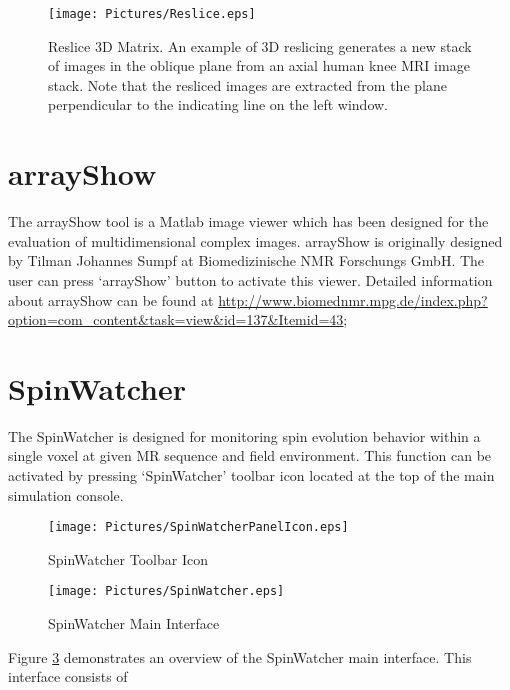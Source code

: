 \documentclass{book}%
\begin{document}
\begin{enumerate}
		\begin{figure}[htbp]
		\centering
			\texttt{[image: Pictures/Reslice.eps]}
		\caption{Reslice 3D Matrix. An example of 3D reslicing generates a new stack of images in the oblique plane from an axial human knee MRI image stack. Note that the resliced images are extracted from the plane perpendicular to the indicating line on the left window.}
		\label{fig:Reslice}
	\end{figure}	
	
\end{enumerate}



\section{arrayShow}

The arrayShow tool is a Matlab image viewer which has been designed for the evaluation of multidimensional complex images. arrayShow is originally designed by Tilman Johannes Sumpf at Biomedizinische NMR Forschungs GmbH. The user can press `arrayShow' button to activate this viewer. Detailed information about arrayShow can be found at \url{http://www.biomednmr.mpg.de/index.php?option=com_content&task=view&id=137&Itemid=43}; 

\section{SpinWatcher}

The SpinWatcher is designed for monitoring spin evolution behavior within a single voxel at given MR sequence and field environment. This function can be activated by pressing `SpinWatcher' toolbar icon located at the top of the main simulation console.

\begin{figure}[htbp]
	\centering
		\texttt{[image: Pictures/SpinWatcherPanelIcon.eps]}
	\caption{SpinWatcher Toolbar Icon}
	\label{fig:SpinWatcherPanelIcon}
\end{figure}

\begin{figure}[htbp]
	\centering
		\texttt{[image: Pictures/SpinWatcher.eps]}
	\caption{SpinWatcher Main Interface}
	\label{fig:SpinWatcher}
\end{figure}

Figure \ref{fig:SpinWatcher} demonstrates an overview of the SpinWatcher main interface. This interface consists of 
\end{document}
